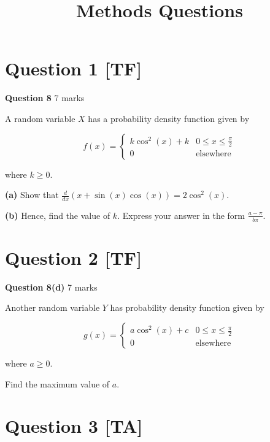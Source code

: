 \documentclass[10pt,a4paper]{article}
\title{Methods Questions}
\author{}
\date{}
\begin{document}
\maketitle

\section*{Question 1 [TF]}

\textbf{Question 8} \hfill 7 marks

A random variable $X$ has a probability density function given by

\[
f(x) = \begin{cases}
k\cos^2(x) + k & 0 \leq x \leq \frac{\pi}{2} \\
0 & \text{elsewhere}
\end{cases}
\]

where $k \geq 0$.

\textbf{(a)} Show that $\frac{d}{dx}(x + \sin(x)\cos(x)) = 2\cos^2(x)$.

\vspace{9\baselineskip}

\textbf{(b)} Hence, find the value of $k$. Express your answer in the form $\frac{a-\pi}{b\pi}$.

\vspace{9\baselineskip}

\hrulefill

\section*{Question 2 [TF]}

\textbf{Question 8(d)} \hfill 7 marks

Another random variable $Y$ has probability density function given by

\[
g(x) = \begin{cases}
a\cos^2(x) + c & 0 \leq x \leq \frac{\pi}{2} \\
0 & \text{elsewhere}
\end{cases}
\]

where $a \geq 0$.

Find the maximum value of $a$.

\vspace{9\baselineskip}

\hrulefill

\section*{Question 3 [TA]}
\end{document}
